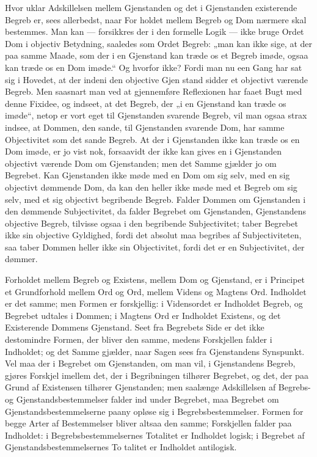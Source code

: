 \documentclass[12pt]{book}
\newcommand{\opage}[1]{\marginnote{\footnotesize\textit{[#1]}}}
\begin{document}
Hvor uklar Adskillelsen mellem Gjenstanden og det i
Gjenstanden existerende Begreb er, sees allerbedst, naar For%
holdet mellem Begreb og Dom nærmere skal bestemmes.
Man kan --- forsikkres der i den formelle Logik --- ikke bruge
Ordet Dom i objectiv Betydning, saaledes som Ordet Begreb:
„man kan ikke sige, at der paa samme Maade, som der i en
Gjenstand kan træde os et Begreb imøde, ogsaa kan træde
os en Dom imøde.“ Og hvorfor ikke? Fordi man nu een
Gang har sat sig i Hovedet, at der indeni den objective Gjen%
stand sidder et objectivt værende Begreb. Men saasnart man
\opage{99}ved at gjennemføre Reflexionen har faaet Bugt med denne Fixidee,
og indseet, at det Begreb, der „i en Gjenstand kan træde
os imøde“, netop er vort eget til Gjenstanden svarende Begreb,
vil man ogsaa strax indsee, at Dommen, den sande, til Gjenstanden
svarende Dom, har samme Objectivitet som det sande
Begreb. At der i Gjenstanden ikke kan træde os en Dom
imøde, er jo vist nok, forsaavidt der ikke kan gives en i Gjenstanden
objectivt værende Dom om Gjenstanden; men det
Samme gjælder jo om Begrebet. Kan Gjenstanden ikke
møde med en Dom om sig selv, med en sig objectivt dømmende
Dom, da kan den heller ikke møde med et Begreb om
sig selv, med et sig objectivt begribende Begreb. Falder
Dommen om Gjenstanden i den dømmende Subjectivitet, da
falder Begrebet om Gjenstanden, Gjenstandens objective Begreb,
tilvisse ogsaa i den begribende Subjectivitet; taber Begrebet
ikke sin objective Gyldighed, fordi det absolut maa begribes
af Subjectiviteten, saa taber Dommen heller ikke sin Objectivitet,
fordi det er en Subjectivitet, der dømmer.

Forholdet mellem Begreb og Existens, mellem Dom og
Gjenstand, er i Principet et Grundforhold mellem Ord og
Ord, mellem Videns og Magtens Ord. Indholdet er det
samme; men Formen er forskjellig: i Vidensordet er Indholdet
Begreb, og Begrebet udtales i Dommen; i Magtens
Ord er Indholdet Existens, og det Existerende Dommens Gjenstand.
Seet fra Begrebets Side er det ikke destomindre Formen,
der bliver den samme, medens Forskjellen falder i Indholdet;
og det Samme gjælder, naar Sagen sees fra Gjenstandens
Synspunkt. Vel maa der i Begrebet om Gjenstanden,
om man vil, i Gjenstandens Begreb, gjøres Forskjel
imellem det, der i Begribningen tilhører Begrebet, og det, der
paa Grund af Existensen tilhører Gjenstanden; men saalænge
Adskillelsen af Begrebs- og Gjenstandsbestemmelser falder ind
under Begrebet, maa Begrebet om Gjenstandsbestemmelserne
paany opløse sig i Begrebsbestemmelser. Formen for begge
\opage{100}Arter af Bestemmelser bliver altsaa den samme; Forskjellen
falder paa Indholdet: i Begrebsbestemmelsernes Totalitet er
Indholdet logisk; i Begrebet af Gjenstandsbestemmelsernes To%
talitet er Indholdet antilogisk.
\end{document}
